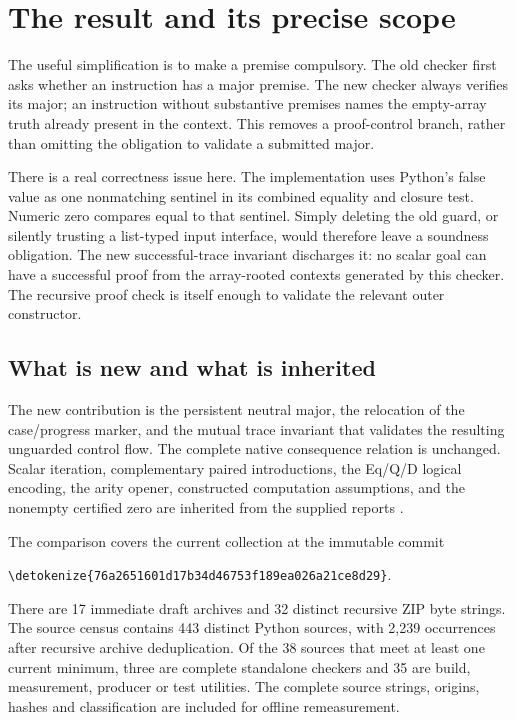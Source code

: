 \documentclass[11pt,letterpaper]{article}
\theoremstyle{definition}\newtheorem{definition}[theorem]{Definition}
\theoremstyle{remark}\newtheorem{remark}[theorem]{Remark}
\newcommand{\file}[1]{\expandafter\nolinkurl\expandafter{\detokenize{#1}}}
\begin{document}
\section{The result and its precise scope}
\label{sec:result}

The useful simplification is to make a premise compulsory. The old
checker first asks whether an instruction has a major premise. The new
checker always verifies its major; an instruction without substantive
premises names the empty-array truth already present in the context.
This removes a proof-control branch, rather than omitting the obligation
to validate a submitted major.

There is a real correctness issue here. The implementation uses Python's
false value as one nonmatching sentinel in its combined equality and
closure test. Numeric zero compares equal to that sentinel. Simply
deleting the old guard, or silently trusting a list-typed input interface,
would therefore leave a soundness obligation. The new successful-trace
invariant discharges it: no scalar goal can have a successful proof from
the array-rooted contexts generated by this checker. The recursive proof
check is itself enough to validate the relevant outer constructor.

\subsection{What is new and what is inherited}

The new contribution is the persistent neutral major, the relocation of
the case/progress marker, and the mutual trace invariant that validates
the resulting unguarded control flow. The complete native consequence
relation is unchanged. Scalar iteration, complementary paired
introductions, the Eq/Q/D logical encoding, the arity opener, constructed
computation assumptions, and the nonempty certified zero are inherited
from the supplied reports \cite{certified,arity,uniform}.

The comparison covers the current collection at the immutable commit
\begin{center}\small
\file{76a2651601d17b34d46753f189ea026a21ce8d29}.
\end{center}
There are 17 immediate draft archives and 32 distinct recursive ZIP byte
strings. The source census contains 443 distinct Python sources, with
2,239 occurrences after recursive archive deduplication. Of the 38
sources that meet at least one current minimum, three are complete
standalone checkers and 35 are build, measurement, producer or test
utilities. The complete source strings, origins, hashes and classification
are included for offline remeasurement.
\end{document}
